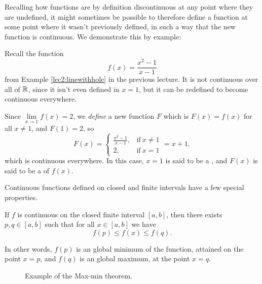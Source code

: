 
Recalling how functions are by definition discontinuous at any point where they are undefined, it might sometimes be possible to therefore define a function at some point where it wasn't previously defined, in such a way that the new function is continuous. We demonstrate this by example:

\begin{example}
	Recall the function
	\[
		f(x) = \frac{x^2 - 1}{x - 1}
	\]
	from Example \ref{lec2:linewithhole} in the previous lecture. It is not continuous over all of $\mathbb{R}$, since it isn't even defined in $x = 1$, but it can be redefined to become continuous everywhere.

	Since $\lim\limits_{x \to 1} f(x) = 2$, we \emph{define} a new function $F$ which is $F(x) = f(x)$ for all $x \neq 1$, and $F(1) = 2$, so
	\[
		F(x) = \begin{cases}
		\frac{x^2 - 1}{x - 1}, & \text{if}~ x \neq 1 \\
		2, & \text{if}~ x = 1
		\end{cases}
		= x + 1,
	\]
	which is continuous everywhere. In this case, $x = 1$ is said to be a , and $F(x)$ is said to be a  of $f(x)$.
\end{example}


Continuous functions defined on closed and finite intervals have a few special properties.

\begin{theorem}
	If $f$ is continuous on the closed finite interval $[a, b]$, then there exists $p, q \in [a, b]$ such that for all $x \in [a, b]$ we have
	\[
		f(p) \leq f(x) \leq f(q).
	\]

	\noindent
	In other words, $f(p)$ is an global minimum of the function, attained on the point $x = p$, and $f(q)$ is an global maximum, at the point $x = q$.
\end{theorem}

\begin{figure}
	\centering
	\caption{Example of the Max-min theorem.}
\end{figure}

